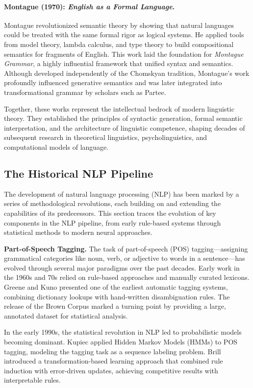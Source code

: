 \paragraph{Montague (1970): \textit{English as a Formal Language}.}
Montague revolutionized semantic theory by showing that natural languages could be treated with the same formal rigor as logical systems. He applied tools from model theory, lambda calculus, and type theory to build compositional semantics for fragments of English. This work laid the foundation for \emph{Montague Grammar}, a highly influential framework that unified syntax and semantics. Although developed independently of the Chomskyan tradition, Montague's work profoundly influenced generative semantics and was later integrated into transformational grammar by scholars such as Partee.

Together, these works represent the intellectual bedrock of modern linguistic theory. They established the principles of syntactic generation, formal semantic interpretation, and the architecture of linguistic competence, shaping decades of subsequent research in theoretical linguistics, psycholinguistics, and computational models of language.

\subsection{The Historical NLP Pipeline}

The development of natural language processing (NLP) has been marked by a series of methodological revolutions, each building on and extending the capabilities of its predecessors. This section traces the evolution of key components in the NLP pipeline, from early rule-based systems through statistical methods to modern neural approaches.

\textbf{Part-of-Speech Tagging.} The task of part-of-speech (POS) tagging—assigning grammatical categories like noun, verb, or adjective to words in a sentence—has evolved through several major paradigms over the past decades. Early work in the 1960s and 70s relied on rule-based approaches and manually curated lexicons. Greene and Kuno \cite{greene1963automatic} presented one of the earliest automatic tagging systems, combining dictionary lookups with hand-written disambiguation rules. The release of the Brown Corpus \cite{francis1979brown} marked a turning point by providing a large, annotated dataset for statistical analysis.

In the early 1990s, the statistical revolution in NLP led to probabilistic models becoming dominant. Kupiec \cite{kupiec1992robust} applied Hidden Markov Models (HMMs) to POS tagging, modeling the tagging task as a sequence labeling problem. Brill \cite{brill1995transformation} introduced a transformation-based learning approach that combined rule induction with error-driven updates, achieving competitive results with interpretable rules.

